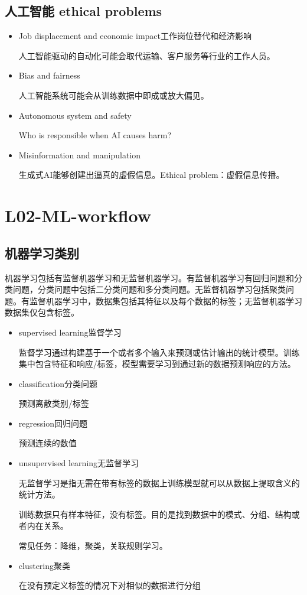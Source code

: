 \documentclass[UTF8]{ctexart}
\begin{document}
\subsection{人工智能 ethical problems}
\begin{itemize}
    \item Job displacement and economic impact工作岗位替代和经济影响
    
    人工智能驱动的自动化可能会取代运输、客户服务等行业的工作人员。
    \item Bias and fairness
    
    人工智能系统可能会从训练数据中即成或放大偏见。
    \item Autonomous system and safety
    
    Who is responsible when AI causes harm?
    \item Misinformation and manipulation
    
    生成式AI能够创建出逼真的虚假信息。Ethical problem：虚假信息传播。
\end{itemize}

\section{L02-ML-workflow}
\subsection{机器学习类别}

机器学习包括有监督机器学习和无监督机器学习。有监督机器学习有回归问题和分类问题，分类问题中包括二分类问题和多分类问题。无监督机器学习包括聚类问题。有监督机器学习中，数据集包括其特征以及每个数据的标签；无监督机器学习数据集仅包含标签。


\begin{itemize}
    \item supervised learning监督学习
    
    监督学习通过构建基于一个或者多个输入来预测或估计输出的统计模型。训练集中包含特征和响应/标签，模型需要学习到通过新的数据预测响应的方法。

    \item classification分类问题
    
    预测离散类别/标签

    \item regression回归问题
    
    预测连续的数值

    \item unsupervised learning无监督学习
    
    无监督学习是指无需在带有标签的数据上训练模型就可以从数据上提取含义的统计方法。
    
    训练数据只有样本特征，没有标签。目的是找到数据中的模式、分组、结构或者内在关系。

    常见任务：降维，聚类，关联规则学习。

    \item clustering聚类
    
    在没有预定义标签的情况下对相似的数据进行分组
\end{itemize}
\end{document}
